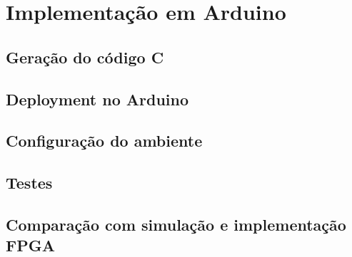 \section{Implementação em Arduino}

\subsection{Geração do código C}
\subsection{Deployment no Arduino}
\subsection{Configuração do ambiente}
\subsection{Testes}
\subsection{Comparação com simulação e implementação FPGA}
